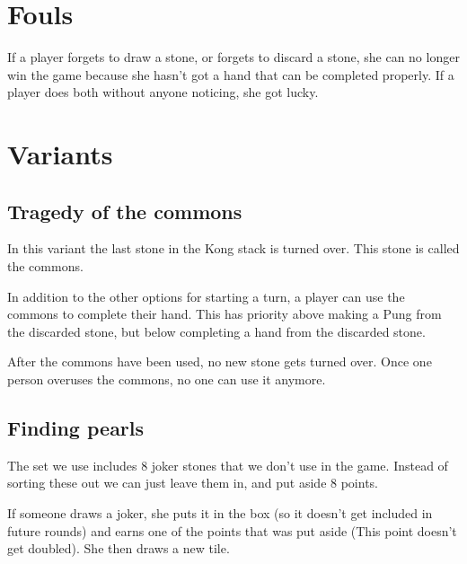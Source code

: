 \documentclass{article}
\begin{document}
\section{Fouls}
If a player forgets to draw a stone, or forgets to discard a stone, she can no longer win the game because she hasn't got a hand that can be completed properly.
If a player does both without anyone noticing, she got lucky.

\section{Variants}
\subsection{Tragedy of the commons}
In this variant the last stone in the Kong stack is turned over. This stone is called the commons.

In addition to the other options for starting a turn, a player can use the commons to complete their hand.
This has priority above making a Pung from the discarded stone, but below completing a hand from the discarded stone.

After the commons have been used, no new stone gets turned over.
Once one person overuses the commons, no one can use it anymore.

\subsection{Finding pearls}
The set we use includes 8 joker stones that we don't use in the game. Instead of sorting these out we can just leave them in, and put aside 8 points.

If someone draws a joker, she puts it in the box (so it doesn't get included in future rounds) and earns one of the points that was put aside (This point doesn't get doubled). She then draws a new tile.

\end{document}
